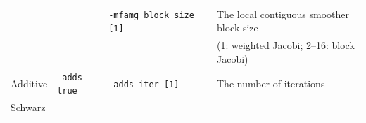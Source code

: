 \documentclass[a4paper]{article}
\begin{document}
\begin{minipage}[t]{\textwidth}
\begin{center}
\begin{tabular}{l|lll}
         &                       & \verb=-mfamg_block_size [1]= & The local contiguous smoother block size \\
         &                       &                              & (1: weighted Jacobi; 2--16: block Jacobi) \\
Additive & \verb=-adds true=     & \verb=-adds_iter [1]=       & The number of iterations   \\
Schwarz  &                       &                             &                            \\
\hline         
\end{tabular}
\end{center}
\end{minipage}
\\ \\
\end{document}
